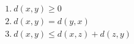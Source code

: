 \documentclass[preview]{standalone}
\begin{document}
\begin{align*}
& 1. \ d(x,y) \geq 0 \\& 2. \ d(x,y)=d(y,x) \\& 3. \ d(x,y) \leq d(x,z) + d(z,y) \\&
\end{align*}
\end{document}
